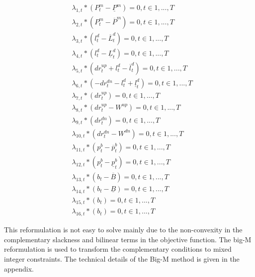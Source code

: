 \begin{align}
& \lambda_{1,t}*(P^m_{t}-\underline P^m) = 0 , t\in{1,...,T}  \\
& \lambda_{2,t} *(P^m_{t}-\overline P^m) = 0 , t\in{1,...,T} \\
& \lambda_{3,t}*(l^d_{t}-\overline L^d_t) = 0 , t\in{1,...,T} \\
& \lambda_{4,t}*(l^d_{t}-\underline L^d_t) = 0 , t\in{1,...,T} \\
& \lambda_{5,t}*(dr_{t}^{up} + l^d_{t} - \overline l^d_{t} ) = 0 , t\in{1,...,T} \\
& \lambda_{6,t}*(-dr_{t}^{dn} - l^d_{t} + \underline l^d_{t} ) = 0 , t\in{1,...,T} \\
& \lambda_{7,t}*(dr_{t}^{up}) = 0 , t\in{1,...,T} \\
& \lambda_{8,t}*(dr_{t}^{up}-W^{up}) = 0 , t\in{1,...,T} \\
& \lambda_{9,t}*(dr_{t}^{dn}) = 0, t\in{1,...,T}  \\
& \lambda_{10,t}*(dr_{t}^{dn}-W^{dn}) = 0 , t\in{1,...,T} \\
& \lambda_{11,t}*( p^b_{t} - \overline p^b_{t} ) = 0 , t\in{1,...,T} \\
& \lambda_{12,t}*( p^b_{t} - \underline p^b_{t} ) = 0 , t\in{1,...,T} \\
& \lambda_{13,t}*( b_{t} - \overline B ) = 0 , t\in{1,...,T} \\
& \lambda_{14,t}*( b_{t} - \underline B ) = 0 , t\in{1,...,T} \\
& \lambda_{15,t}*( b_{t}  ) = 0 , t\in{1,...,T} \\
& \lambda_{16,t}*( b_{t} ) = 0 , t\in{1,...,T} 
\end{align}

This reformulation is not easy to solve mainly due to the non-convexity in the complementary slackness and bilinear terms in the objective function. The big-M reformulation is used to transform the complementary conditions to mixed integer constraints. The technical details of the Big-M method is given in the appendix. 


